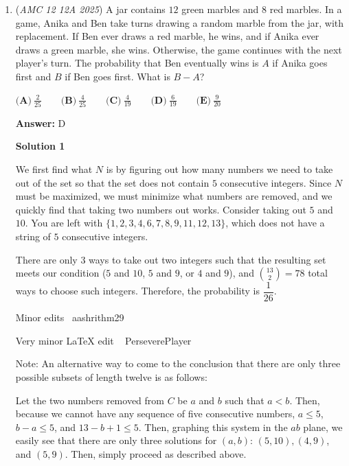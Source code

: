 \begin{enumerate}
 There are $2025$ polynomials like this, so the sum of roots would be $2025\cdot (- \frac{4}{3})$. Finding the harmonic mean, we get:

 
 \[\frac{1}{\frac{1}{4050} \cdot \frac{-4\cdot 2025}{3}} = \frac{1}{\frac{-2}{3}}\]

 Or $\boxed{\textbf{(B) }-\frac{3}{2}}$



	\item (\textit{AMC 12 12A 2025}) A jar contains $12$ green marbles and $8$ red marbles. In a game, Anika and Ben take turns drawing a random marble from the jar, with replacement. If Ben ever draws a red marble, he wins, and if Anika ever draws a green marble, she wins. Otherwise, the game continues with the next player's turn. The probability that Ben eventually wins is $A$ if Anika goes first and $B$ if Ben goes first. What is $B - A$?


 $\textbf{(A)}\   \frac{2}{25}  \qquad                 \textbf{(B)}\   \frac{4}{25}  \qquad                 \textbf{(C)}\   \frac{4}{19}  \qquad                 \textbf{(D)}\   \frac{6}{19}  \qquad                 \textbf{(E)}\   \frac{9}{20}$

 \textbf{Answer: }D



\textbf{Solution 1}

We first find what $N$ is by figuring out how many numbers we need to take out of the set so that the set does not contain $5$ consecutive integers. Since $N$ must be maximized, we must minimize what numbers are removed, and we quickly find that taking two numbers out works. Consider taking out $5$ and $10$. You are left with $\{1,2,3,4,6,7,8,9,11,12,13\}$, which does not have a string of $5$ consecutive integers.

 There are only $3$ ways to take out two integers such that the resulting set meets our condition ($5$ and $10$, $5$ and $9$, or $4$ and $9$), and ${\binom{13}{2}}=78$ total ways to choose such integers. Therefore, the probability is $\boxed{\dfrac{1}{26}}$.

 Minor edits ~aashrithm29

 Very minor LaTeX edit ~ PerseverePlayer

 Note: An alternative way to come to the conclusion that there are only three possible subsets of length twelve is as follows:

 Let the two numbers removed from $C$ be $a$ and $b$ such that $a<b$.  Then, because we cannot have any sequence of five consecutive numbers, $a \leq 5$, $b-a \leq 5$, and $13 - b +1\leq 5$.  Then, graphing this system in the $ab$ plane, we easily see that there are only three solutions for $(a,b)$: $(5,10), (4,9)$, and $(5,9)$. Then, simply proceed as described above. 


\end{enumerate}
